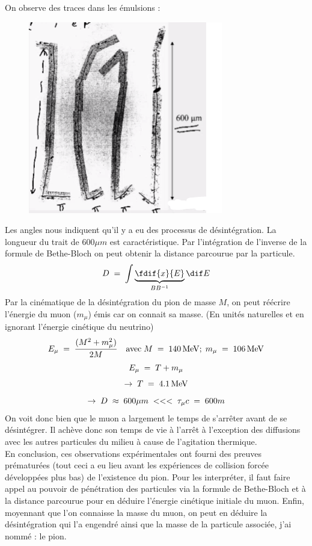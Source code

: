On observe des traces dans les émulsions :
\begin{figure}[H]
    \centering
    \includegraphics{Images4/traces.png}
\end{figure}
Les angles nous indiquent qu'il y a eu des processus de désintégration. La longueur du trait de $600\mu m$ est caractéristique. Par l'intégration de l'inverse de la formule de Bethe-Bloch on peut obtenir la distance parcourue par la particule.
\[
    D\eq \int \underbrace{\fdif{x}{E}}_{BB^{-1}} \dif E
\]
Par la cinématique de la désintégration du pion de masse $M$, on peut réécrire l'énergie du muon ($m_\mu$) émis car on connait sa masse. (En unités naturelles et en ignorant l'énergie cinétique du neutrino)
\[
    E_\mu \; = \; \dfrac{(M^2 + m_\mu^2)}{2M}\quad \text{avec} \; M \; = \; \SI{140}{MeV}; \; m_\mu \; = \; \SI{106}{MeV}
\]
\[
    E_\mu \; = \; T + m_\mu
\]
\[
    \rightarrow\;T\; = \; \SI{4.1}{MeV}
\]
\[
    \rightarrow \; D \; \approx \; 600\mu m \; <<< \; \tau_\mu c \; = \; 600m
\]
On voit donc bien que le muon a largement le temps de s'arrêter avant de se désintégrer. Il achève donc son temps de vie à l'arrêt à l'exception des diffusions avec les autres particules du milieu à cause de l'agitation thermique.\\

En conclusion, ces observations expérimentales ont fourni des preuves prématurées (tout ceci a eu lieu avant les expériences de collision forcée développées plus bas) de l'existence du pion. Pour les interpréter, il faut faire appel au pouvoir de pénétration des particules via la formule de Bethe-Bloch et à la distance parcourue pour en déduire l'énergie cinétique initiale du muon. Enfin, moyennant que l'on connaisse la masse du muon, on peut en déduire la désintégration qui l'a engendré ainsi que la masse de la particule associée, j'ai nommé : le pion.

